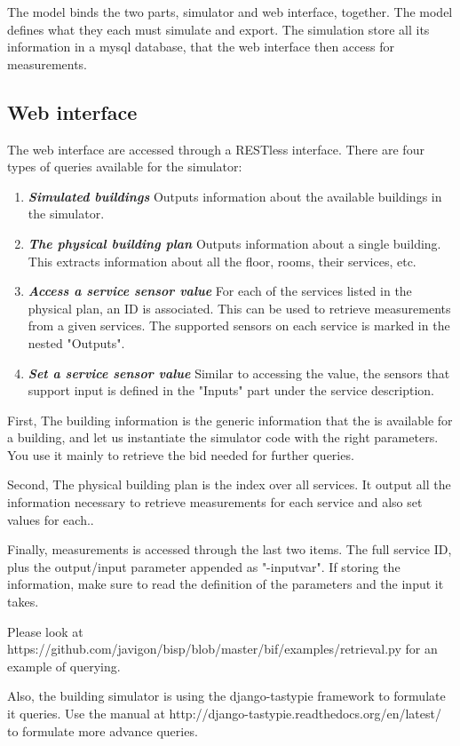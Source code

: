 \documentclass[10pt]{article}
\newcommand{\textdesc}[1]{\textit{\textbf{#1}}} %
\newcommand{\descitem}[1]{\item \textdesc{#1}}
\begin{document}
The model binds the two parts, simulator and web interface, together. The model defines what they
each must simulate and export. The simulation store all its information in a mysql database, that
the web interface then access for measurements. 

\subsection{Web interface}

The web interface are accessed through a RESTless interface. There are four types of queries available for the simulator:

\begin{enumerate}
				\descitem{Simulated buildings} Outputs information about the available buildings in
				the simulator.
				\descitem{The physical building plan} Outputs information about a single building.
				This extracts information about all the floor, rooms, their services, etc. 
				\descitem{Access a service sensor value} For each of the services listed in the
				physical plan, an ID is associated. This can be used to retrieve measurements from a
				given services. The supported sensors on each service is marked in the nested
				"Outputs".
				\descitem{Set a service sensor value} Similar to accessing the value, the sensors
				that support input is defined in the "Inputs" part under the service description.
\end{enumerate}

First, The building information is the generic information that the is available for a building, and let us
instantiate the simulator code with the right parameters. You use it mainly to retrieve the bid
needed for further queries.

Second, The physical building plan is the index over all services. It output all the information necessary
to retrieve measurements for each service and also set values for each..

Finally, measurements is accessed through the last two items. The full service ID, plus the
output/input parameter appended as "-inputvar". If storing the information, make sure to read the
definition of the parameters and the input it takes.

Please look at https://github.com/javigon/bisp/blob/master/bif/examples/retrieval.py for an example
of querying.

Also, the building simulator is using the django-tastypie framework to formulate it queries. Use the
manual at http://django-tastypie.readthedocs.org/en/latest/ to formulate more advance queries.
\end{document}
